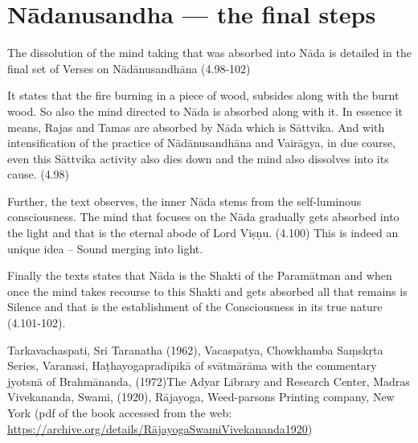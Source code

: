\section*{Nādanusandha --- the final steps}

The dissolution of the mind taking that was absorbed into Nāda is detailed in the final set of Verses on Nādānusandhāna (4.98-102) 
 
It states that the fire burning in a piece of wood, subsides along with the burnt wood. So also the mind directed to Nāda is absorbed along with it. In essence it means, Rajas and Tamas are absorbed by Nāda which is Sāttvika. And with intensification of the practice of Nādānusandhāna and Vairāgya, in due course, even this Sāttvika activity also dies down and the mind also dissolves into its cause. (4.98)

Further, the text observes, the inner Nāda stems from the self-luminous consciousness. The mind that focuses on the Nāda gradually gets absorbed into the light and that is the eternal abode of Lord Viṣṇu. (4.100) This is indeed an unique idea – Sound merging into light.
 
Finally the texts states that Nāda is the Shakti of the Paramātman and when once the mind takes recourse to this Shakti and gets absorbed all that remains is Silence and that is the establishment of the Consciousness in its true nature (4.101-102).  


\begin{thebibliography}{9}
 Tarkavachaspati, Sri Taranatha (1962), Vacaspatya, Chowkhamba Saṃskṛta Series, Varanasi, 
 Haṭhayogapradīpikā of svātmārāma with the commentary jyotsnā  of Brahmānanda, (1972)The Adyar Library and Research Center, Madras 
 Vivekananda, Swami,  (1920), Rājayoga, Weed-parsons Printing company, New York (pdf of the book accessed from the web: \url{https://archive.org/details/RājayogaSwamiVivekananda1920})
\end{thebibliography}
